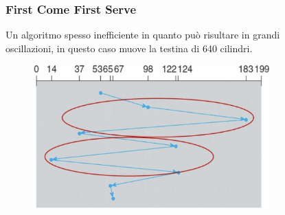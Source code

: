 \begin{figure}[H]
    \centering
    \begin{minipage}{0.5\textwidth}
        \subsubsection*{First Come First Serve}
        Un algoritmo spesso inefficiente in quanto può risultare in grandi oscillazioni, in questo caso muove la testina di 640 cilindri.
    \end{minipage}
    \hfill
    \begin{minipage}{0.4\textwidth}
        \begin{figure}[H]
            \centering
            \includegraphics[width=1\linewidth]{assets/fcfs.jpg}
        \end{figure}
    \end{minipage}
\end{figure}

